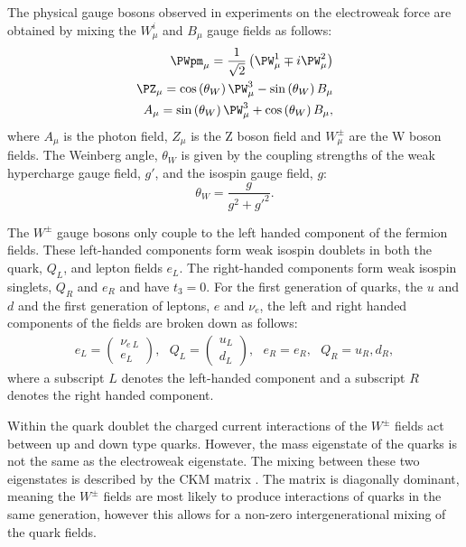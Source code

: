 The physical gauge bosons observed in experiments on the electroweak
force are obtained by mixing the $W_{\mu}^i$ and $B_{\mu}$ gauge
fields as follows:
\begin{equation}
  \begin{split}
  \PWpm_{\mu}=\frac{1}{\sqrt{2}}\left(\PW^{1}_{\mu}\mp i\PW^{2}_{\mu}\right) \\
  \PZ_{\mu}=\cos\left(\theta_{W}\right)\PW^{3}_{\mu}-\sin\left(\theta_{W}\right)B_{\mu} \\
  A_{\mu}=\sin\left(\theta_{W}\right)\PW^{3}_{\mu}+\cos\left(\theta_{W}\right)B_{\mu},
  \end{split}
\end{equation}
where $A_{\mu}$ is the photon field, $Z_{\mu}$ is the Z boson field
and $W^{\pm}_{\mu}$ are the W boson fields. The Weinberg angle,
$\theta_W$ is given by the coupling strengths of the weak hypercharge
gauge field, $g'$, and the isospin gauge field, $g$:
\begin{equation}
\theta_W = \frac{g}{g^2+g'^2}.
\end{equation}

The $W^{\pm}$ gauge bosons only couple to the left handed component of
the fermion fields. These left-handed components form weak isospin
doublets in both the quark, $Q_L$, and lepton fields $e_L$. The
right-handed components form weak isospin singlets, $Q_R$ and $e_R$
and have $t_3=0$. For the first generation of quarks, the $u$ and $d$
and the first generation of leptons, $e$ and $\nu_e$, the left and
right handed components of the fields are broken down as follows:
\begin{equation}
  \begin{split}
  e_L=\left(\begin{array}{c} \nu_{e~L} \\
  e_L\end{array}\right),~~~
  Q_L=\left(\begin{array}{c} u_L \\
  d_L\end{array}\right),~~~e_R=e_R,~~~Q_R=u_R,d_R,
  \end{split}
\end{equation}
where a subscript $L$ denotes the left-handed component and a
subscript $R$ denotes the right handed component.

Within the quark doublet the charged current interactions of the
$W^{\pm}$ fields act between up and down type quarks. However, the
mass eigenstate of the quarks is not the same as the electroweak
eigenstate. The mixing between these two eigenstates is described by
the \ac{CKM} matrix \cite{Kobayashi:1973fv}. The matrix is diagonally
dominant, meaning the $W^{\pm}$ fields are most likely to produce
interactions of quarks in the same generation, however this allows for
a non-zero intergenerational mixing of the quark fields.


